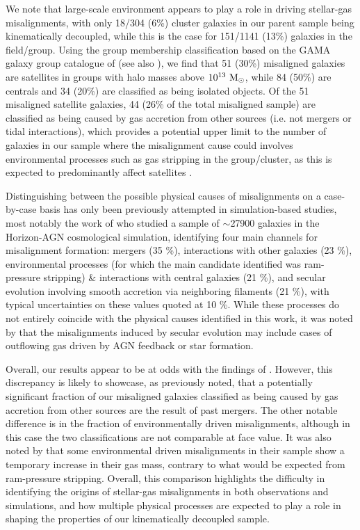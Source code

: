 \documentclass[fleqn,usenatbib]{mnras}
\begin{document}
We note that large-scale environment appears to play a role in driving stellar-gas misalignments, with only 18/304 (6\%) cluster galaxies in our parent sample being kinematically decoupled, while this is the case for 151/1141 (13\%) galaxies in the field/group. 
Using the group membership classification based on  the GAMA galaxy group catalogue of \cite{Robotham2011} (see also \citealt{vds2021}), we find that 51 (30\%) misaligned galaxies are satellites in groups with halo masses above $10^{13}\ \rm{M_{\odot}}$, while 84 (50\%) are centrals and 34 (20\%) are classified as being isolated objects. Of the 51 misaligned satellite galaxies, 44 (26\% of the total misaligned sample) are classified as being caused by gas accretion from other sources (i.e. not mergers or tidal interactions), which provides a potential upper limit to the number of galaxies in our sample where the misalignment cause could involves environmental processes such as gas stripping in the group/cluster, as this is expected to predominantly affect satellites \citep*{Cortese2021}.

Distinguishing between the possible physical causes of misalignments on a case-by-case basis has only been previously attempted in simulation-based studies, most notably the work of \cite{Khim2020II} who studied a sample of $\sim$27900 galaxies in the Horizon-AGN cosmological simulation, identifying four main channels for misalignment formation: mergers (35 \%), interactions with other galaxies (23 \%), environmental processes (for which the main candidate identified was ram-pressure stripping) \& interactions with central galaxies (21 \%), and secular evolution involving smooth accretion via neighboring filaments (21 \%), with typical uncertainties on these values quoted at 10 \%. While these processes do not entirely coincide with the physical causes identified in this work, it was noted by \cite{Khim2020II} that the misalignments induced by secular evolution may include cases of outflowing gas driven by AGN feedback or star formation.

Overall, our results appear to be at odds with the findings of \cite{Khim2020II}. However, this discrepancy is likely to showcase, as previously noted, that a potentially significant fraction of our misaligned galaxies classified as being caused by gas accretion from other sources are the result of past mergers. The other notable difference is in the fraction of environmentally driven misalignments, although in this case the two classifications are not comparable at face value. It was also noted by \cite{Khim2020II} that some environmental driven misalignments in their sample show a temporary increase in their gas mass, contrary to what would be expected from ram-pressure stripping. 
Overall, this comparison highlights the difficulty in identifying the origins of stellar-gas misalignments in both observations and simulations, and how multiple physical processes are expected to play a role in shaping the properties of our kinematically decoupled sample.
\end{document}

